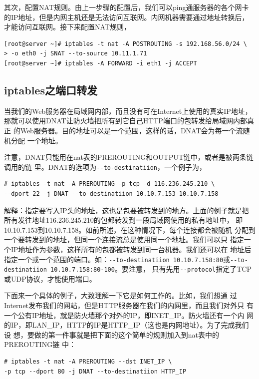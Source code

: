 其次，配置NAT规则。由上一步骤的配置后，我们可以ping通服务器的各个网卡
的IP地址，但是内网主机还是无法访问互联网。内网机器需要通过地址转换后，
才能访问互联网。接下来配置NAT规则，

\begin{verbatim}
[root@server ~]# iptables -t nat -A POSTROUTING -s 192.168.56.0/24 \
> -o eth0 -j SNAT --to-source 10.11.1.71
[root@server ~]# iptables -A FORWARD -i eth1 -j ACCEPT
\end{verbatim}

\subsection{iptables之端口转发}
\label{sec:iptables_port_forward}

当我们的Web服务器在局域网内部，而且没有可在Internet上使用的真实IP地址，
那就可以使用DNAT让防火墙把所有到它自己HTTP端口的包转发给局域网内部真正
的Web服务器。目的地址可以是一个范围，这样的话，DNAT会为每一个流随机分配
一个地址。

注意，DNAT只能用在nat表的PREROUTING和OUTPUT链中，或者是被两条链调用的链
里。DNAT的选项为\verb|--to-destinatiion|，一个例子为，

\begin{verbatim}
# iptables -t nat -A PREROUTING -p tcp -d 116.236.245.210 \ 
--dport 22 -j DNAT --to-destinatiion 10.10.7.153-10.10.7.158
\end{verbatim}

解释：指定要写入IP头的地址，这也是包要被转发到的地方。上面的例子就是把
所有发往地址116.236.245.210的包都转发到一段局域网使用的私有地址中，
即10.10.7.153到10.10.7.158。如前所述，在这种情况下，每个连接都会被随机
分配到一个要转发到的地址，但同一个连接流总是使用同一个地址。我们可以只
指定一个IP地址作为参数，这样所有的包都被转发到同一台机器。我们还可以在
地址后指定一个或一个范围的端口。如：\verb|--to-destinatiion 10.10.7.158:80|或\verb|--to-destinatiion 10.10.7.158:80-100|。要注意，
只有先用\verb|--protocol|指定了TCP或UDP协议，才能使用端口。

下面来一个具体的例子，大致理解一下它是如何工作的。比如，我们想通
过Internet发布我们的网站，但是HTTP服务器在我们的内网里，而且我们对外只
有一个公有IP地址，就是防火墙那个对外的IP，即INET\_IP。防火墙还有一个内
网的IP，即LAN\_IP，HTTP的IP是HTTP\_IP（这也是内网地址）。为了完成我们设
想，要做的第一件事就是把下面的这个简单的规则加入到nat表中的PREROUTING链
中：

\begin{verbatim}
# iptables -t nat -A PREROUTING --dst INET_IP \ 
-p tcp --dport 80 -j DNAT --to-destinatiion HTTP_IP
\end{verbatim}

